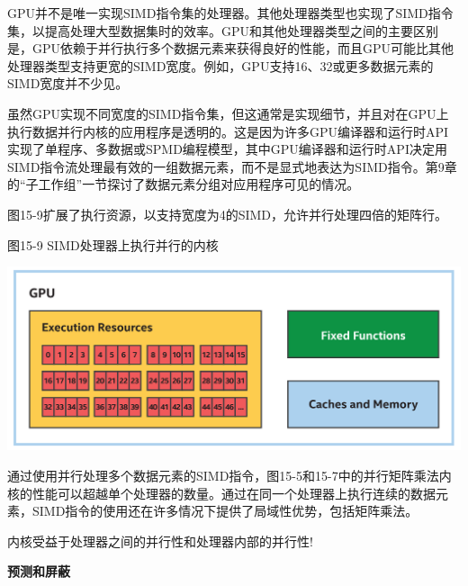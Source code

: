 GPU并不是唯一实现SIMD指令集的处理器。其他处理器类型也实现了SIMD指令集，以提高处理大型数据集时的效率。GPU和其他处理器类型之间的主要区别是，GPU依赖于并行执行多个数据元素来获得良好的性能，而且GPU可能比其他处理器类型支持更宽的SIMD宽度。例如，GPU支持16、32或更多数据元素的SIMD宽度并不少见。\par

\begin{tcolorbox}[colback=blue!5!white,colframe=blue!75!black, title=编程模型:SPMD和SIMD]
虽然GPU实现不同宽度的SIMD指令集，但这通常是实现细节，并且对在GPU上执行数据并行内核的应用程序是透明的。这是因为许多GPU编译器和运行时API实现了单程序、多数据或SPMD编程模型，其中GPU编译器和运行时API决定用SIMD指令流处理最有效的一组数据元素，而不是显式地表达为SIMD指令。第9章的“子工作组”一节探讨了数据元素分组对应用程序可见的情况。
\end{tcolorbox}

图15-9扩展了执行资源，以支持宽度为4的SIMD，允许并行处理四倍的矩阵行。\par

\hspace*{\fill} \par %
图15-9 SIMD处理器上执行并行的内核
\begin{center}
	\includegraphics[width=1.0\textwidth]{content/chapter-15/images/7}
\end{center}

通过使用并行处理多个数据元素的SIMD指令，图15-5和15-7中的并行矩阵乘法内核的性能可以超越单个处理器的数量。通过在同一个处理器上执行连续的数据元素，SIMD指令的使用还在许多情况下提供了局域性优势，包括矩阵乘法。\par

\begin{tcolorbox}[colback=red!5!white,colframe=red!75!black]
内核受益于处理器之间的并行性和处理器内部的并行性!
\end{tcolorbox}

\hspace*{\fill} \par %
\textbf{预测和屏蔽}

